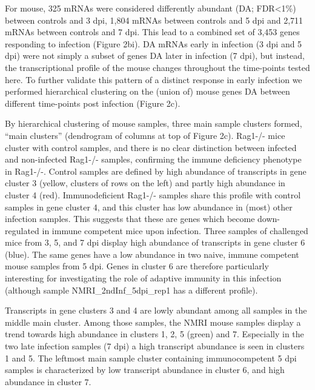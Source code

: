 \documentclass{bmcart}
\begin{document}
For mouse, 325 mRNAs were considered differently abundant (DA; FDR<1\%)
between controls and 3 dpi, 1,804 mRNAs between controls and 5 dpi and 2,711
mRNAs between controls and 7 dpi. This lead to a combined set of 3,453 genes
responding to infection (Figure 2bi). DA mRNAs early in infection (3 dpi
and 5 dpi) were not simply a subset of genes DA later in
infection (7 dpi), but instead, the transcriptional profile of the mouse 
changes throughout the time-points tested here. To further validate this pattern of a distinct
response in early infection we performed hierarchical clustering on
the (union of) mouse genes DA between different time-points post infection (Figure 2c).

By hierarchical clustering of mouse samples, three main sample clusters formed, “main clusters” 
(dendrogram of columns at top of Figure 2c). Rag1-/- mice cluster with control samples, and there is no clear distinction between infected and non-infected Rag1-/- samples, confirming the immune deficiency phenotype in Rag1-/-. Control samples are defined by high abundance of transcripts in gene cluster 3 (yellow, clusters of rows on the left) and partly high abundance in cluster 4 (red). Immunodeficient Rag1-/- samples share this profile with control samples in gene cluster 4, and this cluster has low abundance in (most) other infection samples. This suggests that these are genes which become down-regulated in immune competent mice upon infection. 
Three samples of challenged mice from 3, 5, and 7 dpi display high abundance of transcripts in gene cluster 6 (blue). The same genes have a low abundance in two naive, immune competent mouse samples from 5 dpi. Genes in cluster 6 are therefore particularly interesting for investigating the role of adaptive immunity in this infection (although sample NMRI\_2ndInf\_5dpi\_rep1 has a different profile). 

Transcripts in gene clusters 3 and 4 are lowly abundant among all samples in the middle main cluster. Among those samples, the NMRI mouse samples display a trend towards high abundance in clusters 1, 2, 5 (green) and 7. Especially in the two late infection samples (7 dpi) a high transcript abundance is seen in clusters 1 and 5. The leftmost main sample cluster containing immunocompetent 5 dpi samples is characterized by low transcript abundance in cluster 6, and high abundance in cluster 7. 
\end{document}
